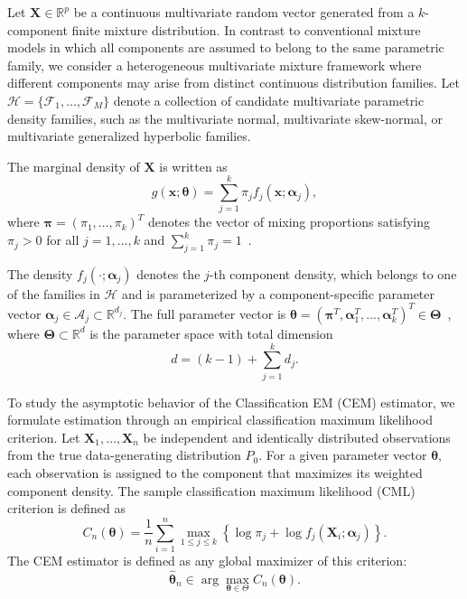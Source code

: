 \documentclass[pdflatex,sn-mathphys-ay]{sn-jnl}%
\let\oldtheta\theta
\renewcommand{\theta}{\boldsymbol{\oldtheta}}
\let\oldalpha\alpha
\renewcommand{\alpha}{\boldsymbol{\oldalpha}}
\theoremstyle{thmstyleone}%
\theoremstyle{thmstyletwo}%
\theoremstyle{thmstylethree}%
\begin{document}
Let $\mathbf{X}\in\mathbb{R}^p$ be a continuous multivariate random vector generated from a $k$-component finite mixture distribution. In contrast to conventional mixture models in which all components are assumed to belong to the same parametric family, we consider a heterogeneous multivariate mixture framework where different components may arise from distinct continuous distribution families. Let
   $ \mathcal{H}
    =
    \{
    \mathcal{F}_1,\ldots,\mathcal{F}_M
    \}$ denote a collection of candidate multivariate parametric density families, such as the multivariate normal, multivariate skew-normal, or multivariate generalized hyperbolic families.

The marginal density of $\mathbf{X}$ is written as
\begin{equation}
    g(\mathbf{x};\boldsymbol{\theta})
    =
    \sum_{j=1}^k
    \pi_j
    f_j(\mathbf{x};\boldsymbol{\alpha}_j),
    \label{eq:mixture_density}
\end{equation}
where $\boldsymbol{\pi} = (\pi_1,\ldots,\pi_k)^T$ denotes the vector of mixing proportions satisfying $\pi_j>0$ for all $j=1,\ldots,k$ and $\sum_{j=1}^k \pi_j = 1$~.

The density $f_j(\cdot;\boldsymbol{\alpha}_j)$ denotes the $j$-th component density, which belongs to one of the families in $\mathcal{H}$ and is parameterized by a component-specific parameter vector $\boldsymbol{\alpha}_j \in \mathcal{A}_j \subset \mathbb{R}^{d_j}$. The full parameter vector is
    $\boldsymbol{\theta}
    =
    (
    \boldsymbol{\pi}^T,
    \boldsymbol{\alpha}_1^T,
    \ldots,
    \boldsymbol{\alpha}_k^T
    )^T
    \in
   \boldsymbol{\Theta}$~, where
   $\boldsymbol{\Theta}
    \subset
    \mathbb{R}^d$
is the parameter space with total dimension
\[
    d
    =
    (k-1)
    +
    \sum_{j=1}^k d_j.
\]

To study the asymptotic behavior of the Classification EM (CEM) estimator, we formulate estimation through an empirical classification maximum likelihood criterion. Let $\mathbf{X}_1,\ldots,\mathbf{X}_n$ be independent and identically distributed observations from the true data-generating distribution $P_0$. For a given parameter vector $\boldsymbol{\theta}$, each observation is assigned to the component that maximizes its weighted component density. The sample classification maximum likelihood (CML) criterion is defined as
\begin{equation}
    C_n(\boldsymbol{\theta})
    =
    \frac{1}{n}
    \sum_{i=1}^n
    \max_{1\leq j\leq k}
    \left\{
        \log \pi_j
        +
        \log f_j(\mathbf{X}_i;\boldsymbol{\alpha}_j)
    \right\}.
    \label{eq:sample_cml}
\end{equation}
The CEM estimator is defined as any global maximizer of this criterion:
\begin{equation}
    \widehat{\boldsymbol{\theta}}_n
    \in
    \arg\max_{\boldsymbol{\theta}\in\Theta}
    C_n(\boldsymbol{\theta}).
    \label{eq:cem_estimator}
\end{equation}
\end{document}
